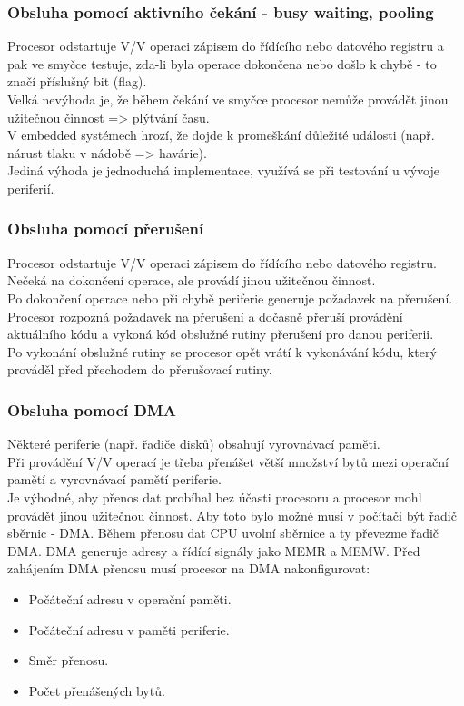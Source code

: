 \subsubsection*{Obsluha pomocí aktivního čekání - busy waiting, pooling}
Procesor odstartuje V/V operaci zápisem do řídícího nebo datového registru a pak ve smyčce testuje, zda-li byla operace dokončena nebo došlo k chybě - to značí příslušný bit (flag).\\
Velká nevýhoda je, že během čekání ve smyčce procesor nemůže provádět jinou užitečnou činnost => plýtvání času.\\
V embedded systémech hrozí, že dojde k promeškání důležité události (např. nárust tlaku v nádobě => havárie).\\
Jediná výhoda je jednoduchá implementace, využívá se při testování u vývoje periferií.\\

\subsubsection*{Obsluha pomocí přerušení}
Procesor odstartuje V/V operaci zápisem do řídícího nebo datového registru. \\
Nečeká na dokončení operace, ale provádí jinou užitečnou činnost.\\
Po dokončení operace nebo při chybě periferie generuje požadavek na přerušení.\\
Procesor rozpozná požadavek na přerušení a dočasně přeruší provádění aktuálního kódu a vykoná kód obslužné rutiny přerušení pro danou periferii. \\
Po vykonání obslužné rutiny se procesor opět vrátí k vykonávání kódu, který prováděl před přechodem do přerušovací rutiny.\\

\subsubsection*{Obsluha pomocí DMA}
Některé periferie (např. řadiče disků) obsahují vyrovnávací paměti.\\
Při provádění V/V operací je třeba přenášet větší množství bytů mezi operační pamětí a vyrovnávací pamětí periferie. \\
Je výhodné, aby přenos dat probíhal bez účasti procesoru a procesor mohl provádět jinou užitečnou činnost. Aby toto bylo možné musí v počítači být řadič sběrnic - DMA. Během přenosu dat CPU uvolní sběrnice a ty převezme řadič DMA. DMA generuje adresy a řídící signály jako MEMR a MEMW.
Před zahájením DMA přenosu musí procesor na DMA nakonfigurovat:
\begin{itemize}
    \item Počáteční adresu v operační paměti.
    \item Počáteční adresu v paměti periferie.
    \item Směr přenosu.
    \item Počet přenášených bytů.
\end{itemize}

